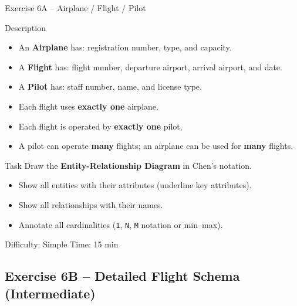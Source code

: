 \documentclass[10pt]{beamer}
\begin{document}
\begin{frame}{Exercise 6A -- Airplane / Flight / Pilot}
  \begin{block}{Description}
    \begin{itemize}
      \item An \textbf{Airplane} has: registration number, type, and capacity.
      \item A \textbf{Flight} has: flight number, departure airport, arrival airport, and date.
      \item A \textbf{Pilot} has: staff number, name, and license type.
      \item Each flight uses \textbf{exactly one} airplane.
      \item Each flight is operated by \textbf{exactly one} pilot.
      \item A pilot can operate \textbf{many} flights; an airplane can be used for \textbf{many} flights.
    \end{itemize}
  \end{block}

  \begin{block}{Task}
    Draw the \textbf{Entity-Relationship Diagram} in Chen's notation.
    \begin{itemize}
      \item Show all entities with their attributes (underline key attributes).
      \item Show all relationships with their names.
      \item Annotate all cardinalities (\texttt{1}, \texttt{N}, \texttt{M} notation or min--max).
    \end{itemize}
  \end{block}

  \begin{alertblock}{Difficulty: Simple \quad Time: 15 min}
  \end{alertblock}
\end{frame}

\subsection{Exercise 6B -- Detailed Flight Schema (Intermediate)}
\end{document}
